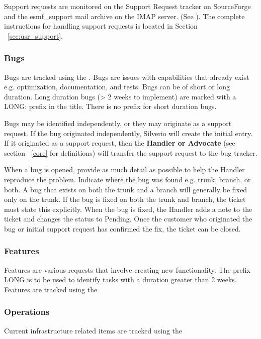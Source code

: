 Support requests are monitored on the Support Request tracker on SourceForge and the esmf\_support mail archive on the IMAP server. (See ). The complete instructions for handling support requests is located in Section ~\ref{sec:usr_support}.

\subsubsection{Bugs}

Bugs are tracked using the . Bugs are issues with capabilities that already exist e.g. optimization, documentation, and tests. Bugs can be of short or long duration.  Long duration bugs (> 2 weeks to implement) are marked with a LONG: prefix in the title.  There is no prefix for short duration bugs.

Bugs may be identified independently, or they may originate as a support request. If the bug originated independently, Silverio will create the initial entry. If it originated as a support request, then the {\bf Handler or Advocate} (see section ~\ref{core} for definitions) will transfer the support request to the bug tracker. 

When a bug is opened, provide as much detail as possible to help the Handler reproduce the problem. Indicate where the bug was found e.g. trunk, branch, or both. A bug that exists on both the trunk and a branch will generally be fixed only on the trunk. If the bug is fixed on both the trunk and branch, the ticket must  state this explicitly. When the bug is fixed, the Handler adds a note to the ticket and changes the status to Pending. Once the customer who originated the bug or initial support request has confirmed the fix, the ticket can be closed. 

\subsubsection{Features}

Features are various requests that involve creating new functionality. The prefix LONG is to be used to identify tasks with a duration greater than 2 weeks. Features are tracked using the 

\subsubsection{Operations}
Current infrastructure related items are tracked using the 

